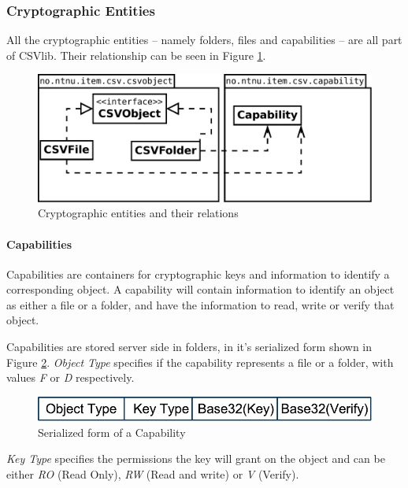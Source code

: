 \documentclass[pdftex,english,10pt,b5paper,twoside]{book}
\begin{document}
\subsubsection{Cryptographic Entities}
All the cryptographic entities -- namely folders, files and capabilities -- are all
part of CSVlib. Their relationship can be seen in Figure \ref{fig:CSVlib:overview}.

\begin{figure}[h!]
    \centering
    \includegraphics[scale=0.4]{csvobjects.pdf}
    \caption{Cryptographic entities and their relations}
    \label{fig:CSVlib:overview}
\end{figure}

\paragraph{Capabilities} Capabilities are containers for
cryptographic keys and information to identify a corresponding object. A
capability will contain information to identify an object as either a file or a
folder, and have the information to read, write or verify that object.

Capabilities are stored server side in folders, in it's serialized form shown
in Figure \ref{fig:CAP:serial}. \emph{Object Type} specifies if the capability
represents a file or a folder, with values \emph{F} or \emph{D}
respectively.

\begin{figure}[h!]
    \centering
    \includegraphics[scale=0.6]{CapabilitySerialization.pdf}
    \caption{Serialized form of a Capability}
    \label{fig:CAP:serial}
\end{figure}

\emph{Key Type} specifies the permissions the key will grant on the object and
can be either \emph{RO} (Read Only), \emph{RW} (Read and write) or \emph{V}
(Verify).
\end{document}
